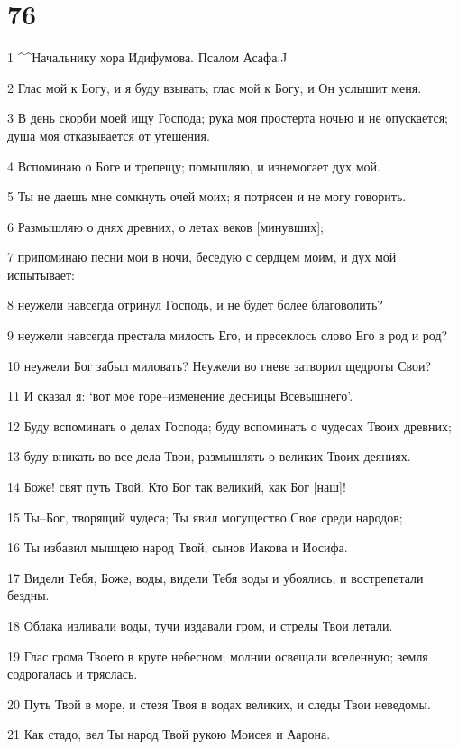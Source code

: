 \chapter{76}

\par 1 ^^Начальнику хора Идифумова. Псалом Асафа.^^
\par 2 Глас мой к Богу, и я буду взывать; глас мой к Богу, и Он услышит меня.
\par 3 В день скорби моей ищу Господа; рука моя простерта ночью и не опускается; душа моя отказывается от утешения.
\par 4 Вспоминаю о Боге и трепещу; помышляю, и изнемогает дух мой.
\par 5 Ты не даешь мне сомкнуть очей моих; я потрясен и не могу говорить.
\par 6 Размышляю о днях древних, о летах веков [минувших];
\par 7 припоминаю песни мои в ночи, беседую с сердцем моим, и дух мой испытывает:
\par 8 неужели навсегда отринул Господь, и не будет более благоволить?
\par 9 неужели навсегда престала милость Его, и пресеклось слово Его в род и род?
\par 10 неужели Бог забыл миловать? Неужели во гневе затворил щедроты Свои?
\par 11 И сказал я: `вот мое горе--изменение десницы Всевышнего'.
\par 12 Буду вспоминать о делах Господа; буду вспоминать о чудесах Твоих древних;
\par 13 буду вникать во все дела Твои, размышлять о великих Твоих деяниях.
\par 14 Боже! свят путь Твой. Кто Бог так великий, как Бог [наш]!
\par 15 Ты--Бог, творящий чудеса; Ты явил могущество Свое среди народов;
\par 16 Ты избавил мышцею народ Твой, сынов Иакова и Иосифа.
\par 17 Видели Тебя, Боже, воды, видели Тебя воды и убоялись, и вострепетали бездны.
\par 18 Облака изливали воды, тучи издавали гром, и стрелы Твои летали.
\par 19 Глас грома Твоего в круге небесном; молнии освещали вселенную; земля содрогалась и тряслась.
\par 20 Путь Твой в море, и стезя Твоя в водах великих, и следы Твои неведомы.
\par 21 Как стадо, вел Ты народ Твой рукою Моисея и Аарона.

